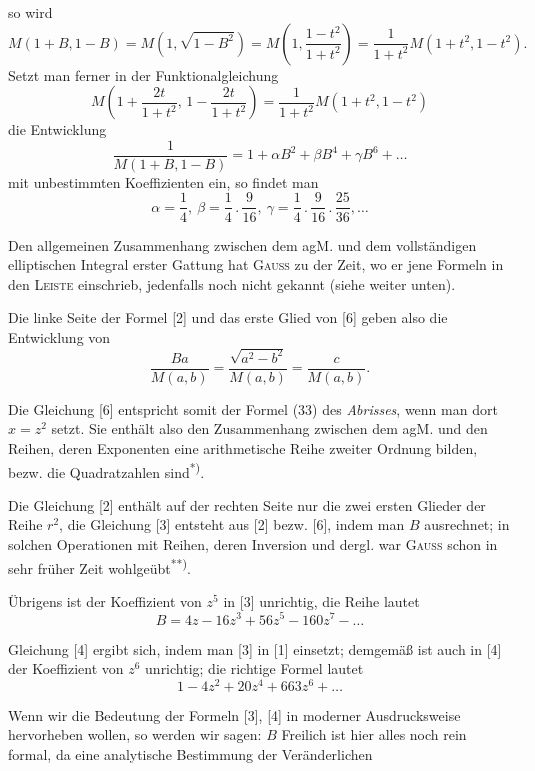 \clearpage
{}
\noindent so wird
\[M(1+B,1-B)=M(1,\sqrt{1-B^2})=M\left(1,\frac{1-t^2}{1+t^2}\right)=\frac1{1+t^2}M(1+t^2,1-t^2).\]
\noindent Setzt man ferner in der Funktionalgleichung
\[M\left(1+\frac{2t}{1+t^2},\,1-\frac{2t}{1+t^2}\right)=\frac1{1+t^2}M(1+t^2,1-t^2)\]
\noindent die Entwicklung
\[\frac1{M(1+B,1-B)}=1+\alpha B^2+\beta B^4+\gamma B^6+\ldots\]
\noindent mit unbestimmten Koeffizienten ein, so findet man
\[\alpha=\frac14,\ \beta=\frac14\,.\,\frac9{16},\ \gamma=\frac14\,.\,\frac9{16}\,.\,\frac{25}{36},\ldots\]
\par\indent Den allgemeinen Zusammenhang zwischen dem agM. und dem vollständigen elliptischen Integral erster Gattung hat \textsc{Gauss} zu der Zeit, wo er jene Formeln in den \textsc{Leiste} einschrieb, jedenfalls noch nicht gekannt (siehe weiter unten).
\par\indent Die linke Seite der Formel [2] und das erste Glied von [6] geben also die Entwicklung von
\[\frac{Ba}{M(a,b)}=\frac{\sqrt{a^2-b^2}}{M(a,b)}=\frac{c}{M(a,b)}.\]
\par\indent Die Gleichung [6] entspricht somit der Formel (33) des \textit{Abrisses}, wenn man dort $x=z^2$ setzt. Sie enthält also den Zusammenhang zwischen dem agM. und den Reihen, deren Exponenten eine arithmetische Reihe zweiter Ordnung bilden, bezw. die Quadratzahlen sind\textsuperscript{*)}.
\par\indent Die Gleichung [2] enthält auf der rechten Seite nur die zwei ersten Glieder der Reihe $r^2$, die Gleichung [3] entsteht aus [2] bezw. [6], indem man $B$ ausrechnet; in solchen Operationen mit Reihen, deren Inversion und dergl. war \textsc{Gauss} schon in sehr früher Zeit wohlgeübt\textsuperscript{**)}.
\par\indent Übrigens ist der Koeffizient von $z^5$ in [3] unrichtig, die Reihe lautet
\begin{equation*}\tag*{$[3]'$}B=4z-16z^3+56z^5-160z^7-\ldots\end{equation*}
\par\indent Gleichung [4] ergibt sich, indem man [3] in [1] einsetzt; demgemäß ist auch in [4] der Koeffizient von $z^6$ unrichtig; die richtige Formel lautet
\begin{equation*}\tag*{$[4]'$}1-4z^2+20z^4+663z^6+\ldots\end{equation*}
\par\indent Wenn wir die Bedeutung der Formeln [3], [4] in moderner Ausdrucksweise hervorheben wollen, so werden wir sagen:  $B$  Freilich ist hier alles noch rein formal, da eine analytische Bestimmung der Veränderlichen
